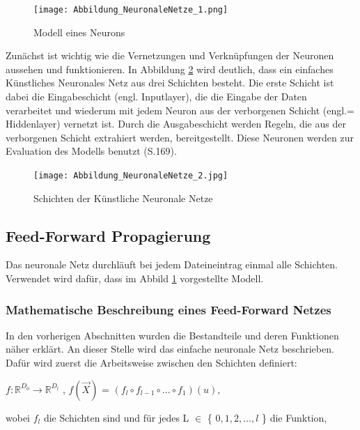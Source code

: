 \documentclass[12pt]{scrreprt}
\begin{document}
\begin{figure}[h!]
	\centering
	\texttt{[image: Abbildung\_NeuronaleNetze\_1.png]}
	\caption{Modell eines Neurons \cite{Abbildung2}}
	\label{fig:fig2}
\end{figure}
	
Zunächst ist wichtig wie die Vernetzungen und Verknüpfungen der Neuronen aussehen und funktionieren. In Abbildung \ref{fig:fig3} wird deutlich, dass ein einfaches Künstliches Neuronales Netz aus drei Schichten besteht. Die erste Schicht ist dabei die Eingabeschicht (engl. Inputlayer), die die Eingabe der Daten verarbeitet und wiederum mit jedem Neuron aus der verborgenen Schicht (engl.= Hiddenlayer) vernetzt ist. Durch die Ausgabeschicht werden Regeln, die aus der verborgenen Schicht extrahiert werden, bereitgestellt. Diese Neuronen werden zur Evaluation des Modells benutzt \cite{Frochte2021}(S.169).
	
\begin{figure}[h!]
	\centering
	\texttt{[image: Abbildung\_NeuronaleNetze\_2.jpg]}
	\caption{Schichten der Künstliche Neuronale Netze \cite{Abbildung3}}
	\label{fig:fig3}
\end{figure}
	
\subsection{Feed-Forward Propagierung}

Das neuronale Netz durchläuft bei jedem Dateineintrag einmal alle Schichten. Verwendet wird dafür, dass im Abbild \ref{fig:fig2} vorgestellte Modell.

\subsubsection{Mathematische Beschreibung eines Feed-Forward Netzes}

In den vorherigen Abschnitten wurden die Bestandteile und deren Funktionen näher erklärt. An dieser Stelle wird das einfache neuronale Netz beschrieben. Dafür wird zuerst die Arbeitsweise zwischen den Schichten definiert:

\begin{center}
	$f: \mathbb{R}^{D_{0}} \to \mathbb{R}^{D_{l}}$ , $f(\overrightarrow{X})$ = $(f_{l} \circ f_{l-1} \circ ... \circ f_{1})(u)$,
\end{center}

wobei $f_{l}$ die Schichten sind und für jedes L $\in$ \{ $0, 1, 2, ..., l$ \} die Funktion,\\
\end{document}
